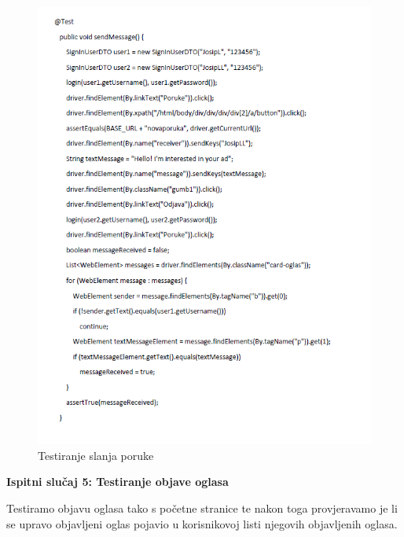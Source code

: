 			
			\begin{figure}[H]
				\includegraphics[scale=1.1]{slike/sel4.PNG} %
				\centering
				\caption{Testiranje slanja poruke}
				\label{fig:sel4}
			\end{figure}
			
			\textbf{Ispitni slučaj 5: Testiranje objave oglasa
				}
			
			Testiramo objavu oglasa tako s početne stranice te nakon toga provjeravamo je li se upravo objavljeni oglas pojavio u korisnikovoj listi njegovih objavljenih oglasa. 
			
